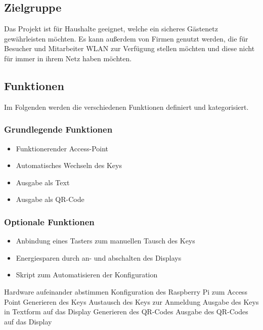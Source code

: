 \documentclass[a4paper,11pt,singlespacing]{article}
\begin{document}
		\subsection{Zielgruppe}
		Das Projekt ist für Haushalte geeignet, welche ein sicheres Gästenetz gewährleisten möchten. Es kann außerdem von Firmen genutzt werden, die für Besucher und Mitarbeiter WLAN zur Verfügung stellen möchten und diese nicht für immer in ihrem Netz haben möchten. 
		
		\subsection{Funktionen}
		Im Folgenden werden die verschiedenen Funktionen definiert und kategorisiert.
			\subsubsection{Grundlegende Funktionen}
			\begin{itemize}
				\item Funktionerender Access-Point
				\item Automatisches Wechseln des Keys
				\item Ausgabe als Text
				\item Ausgabe als QR-Code
			\end{itemize}
		
			\subsubsection{Optionale Funktionen}
			\begin{itemize}
				\item Anbindung eines Tasters zum manuellen Tausch des Keys 
				\item Energiesparen durch an- und abschalten des Displays
				\item Skript zum Automatisieren der Konfiguration
			\end{itemize}


Hardware aufeinander abstimmen 
Konfiguration des Raspberry Pi zum Access Point
Generieren des Keys
Austausch des Keys zur Anmeldung
Ausgabe des Keys in Textform auf das Display
Generieren des QR-Codes
Ausgabe des QR-Codes auf das Display
\end{document}
